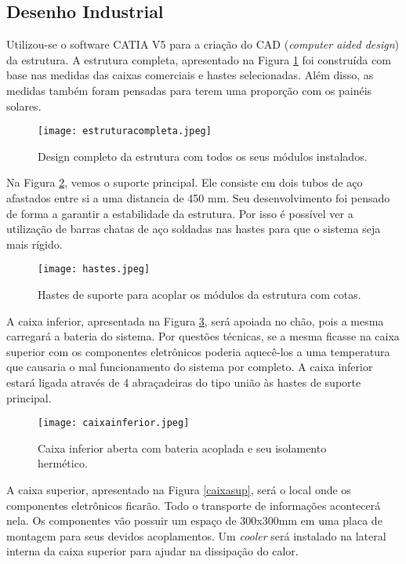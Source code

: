\subsection{Desenho Industrial}

Utilizou-se o software CATIA V5 para a criação do CAD (\textit{computer aided design}) da estrutura. A estrutura completa, apresentado na Figura \ref{estrucomp} foi construída com base nas medidas das caixas comerciais e hastes selecionadas. Além disso, as medidas também foram pensadas para terem uma proporção com os painéis solares. 

\begin{figure}[h]
	\centering
    \texttt{[image: estruturacompleta.jpeg]}
    \caption{Design completo da estrutura com todos os seus módulos instalados.}
    \label{estrucomp}
\end{figure}


Na Figura \ref{hastes}, vemos o suporte principal. Ele consiste em dois tubos de aço afastados entre si a uma distancia de 450 mm. Seu desenvolvimento foi pensado de forma a garantir a estabilidade da estrutura. Por isso é possível ver a utilização de barras chatas de aço soldadas nas hastes para que o sistema seja mais rígido.

\begin{figure}[h]
	\centering
    \texttt{[image: hastes.jpeg]}
    \caption{Hastes de suporte para acoplar os módulos da estrutura com cotas.}
    \label{hastes}
\end{figure}

A caixa inferior, apresentada na Figura \ref{caixainf}, será apoiada no chão, pois a mesma carregará a bateria do sistema. Por questões técnicas, se a mesma ficasse na caixa superior com os componentes eletrônicos poderia aquecê-los a uma temperatura que causaria o mal funcionamento do sistema por completo. A caixa inferior estará ligada através de 4 abraçadeiras do tipo união às hastes de suporte principal.

\begin{figure}[h]
	\centering
    \texttt{[image: caixainferior.jpeg]}
    \caption{Caixa inferior aberta com bateria acoplada e seu isolamento hermético.}
    \label{caixainf}
\end{figure}

A caixa superior, apresentado na Figura \ref{caixasup}, será o local onde os componentes eletrônicos ficarão. Todo o transporte de informações acontecerá nela. Os componentes vão possuir um espaço de 300x300mm em uma placa de montagem para seus devidos acoplamentos. Um \textit{cooler} será instalado na lateral interna da caixa superior para ajudar na dissipação do calor. 

